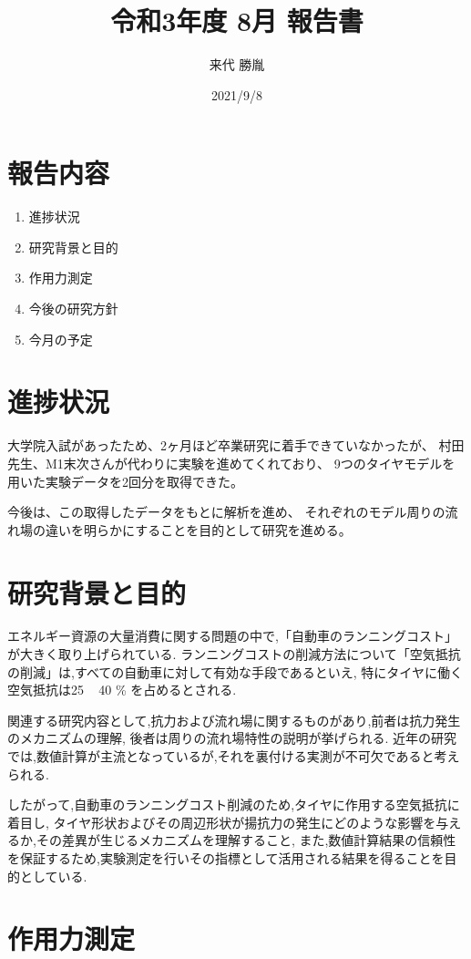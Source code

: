\documentclass[twocolumn,a4j]{jsarticle}
\author{来代 勝胤}
\title{令和3年度 8月 報告書}
\date{2021/9/8}
\begin{document}
\columnseprule=0.1mm

\maketitle
\section*{報告内容}
\begin{enumerate}[1.]
    \item 進捗状況
    \item 研究背景と目的
    \item 作用力測定 
    \item 今後の研究方針
    \item 今月の予定
\end{enumerate}
\section{進捗状況}
大学院入試があったため、2ヶ月ほど卒業研究に着手できていなかったが、
村田先生、M1末次さんが代わりに実験を進めてくれており、
9つのタイヤモデルを用いた実験データを2回分を取得できた。\par
今後は、この取得したデータをもとに解析を進め、
それぞれのモデル周りの流れ場の違いを明らかにすることを目的として研究を進める。
\section{研究背景と目的}
エネルギー資源の大量消費に関する問題の中で,「自動車のランニングコスト」が大きく取り上げられている.
ランニングコストの削減方法について「空気抵抗の削減」は,すべての自動車に対して有効な手段であるといえ,
特にタイヤに働く空気抵抗は25 ~ 40 \% を占めるとされる. \par
関連する研究内容として,抗力および流れ場に関するものがあり,前者は抗力発生のメカニズムの理解,
後者は周りの流れ場特性の説明が挙げられる.
近年の研究では,数値計算が主流となっているが,それを裏付ける実測が不可欠であると考えられる.\par 
したがって,自動車のランニングコスト削減のため,タイヤに作用する空気抵抗に着目し,
タイヤ形状およびその周辺形状が揚抗力の発生にどのような影響を与えるか,その差異が生じるメカニズムを理解すること,
また,数値計算結果の信頼性を保証するため,実験測定を行いその指標として活用される結果を得ることを目的としている. 
\newpage
\section{作用力測定}
\end{document}
